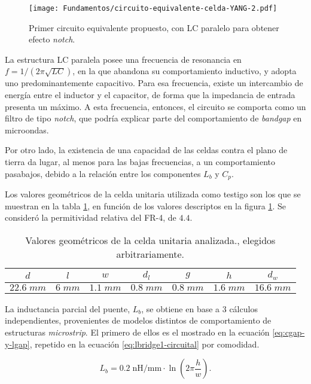 \begin{figure}[h]
	\centering
	\texttt{[image: Fundamentos/circuito-equivalente-celda-YANG-2.pdf]}
	\caption{Primer circuito equivalente propuesto, con LC paralelo para obtener efecto \textit{notch}.}
	\label{fig:primerCircuitoPropuesto}
\end{figure}

La estructura LC paralela posee una frecuencia de resonancia en $f=1/(2 \pi \sqrt{LC})$, en la que abandona su comportamiento inductivo, y adopta uno predominantemente capacitivo. Para esa frecuencia, existe un intercambio de energía entre el inductor y el capacitor, de forma que la impedancia de entrada presenta un máximo. A esta frecuencia, entonces, el circuito se comporta como un filtro de tipo \textit{notch}, que podría explicar parte del comportamiento de \textit{bandgap} en microondas.

Por otro lado, la existencia de una capacidad de las celdas contra el plano de tierra da lugar, al menos para las bajas frecuencias, a un comportamiento pasabajos, debido a la relación entre los componentes $L_b$ y $C_p$.

Los valores geométricos de la celda unitaria utilizada como testigo son los que se muestran en la tabla \ref{table:CeldaUnitariaAnalisisiCircuital}, en función de los valores descriptos en la figura \ref{fig:primerCircuitoPropuesto}. Se consideró la permitividad relativa del FR-4, de $4.4$.

\begin{table}
	\centering
	\begin{tabular}{|c|c|c|c|c|c|c|}
		
		\hline
		$d$ & $l$ & $w$ & $d_l$ & $g$ & $h$ & $d_w$\\ 
		\hline
		$22.6\;mm$ & $6\;mm$ & $1.1\;mm$ & $0.8\;mm$ & $0.8\;mm$ & $1.6\;mm$ & $16.6\;mm$\\ 
		\hline 
	\end{tabular}
	\caption{Valores geométricos de la celda unitaria analizada., elegidos arbitrariamente.}
	\label{table:CeldaUnitariaAnalisisiCircuital}
\end{table}

La inductancia parcial del puente, $L_b$, se obtiene en base a 3 cálculos independientes, provenientes de modelos distintos de comportamiento de estructuras \textit{microstrip}. El primero de ellos es el mostrado en la ecuación \ref{eq:cgap-y-lgap}, repetido en la ecuación \ref{eq:lbridge1-circuital} por comodidad.

\begin{equation}
\label{eq:lbridge1-circuital}
L_{b} = 0.2\; \text{nH/mm} \cdot \ln \left(2\pi \frac{h}{w}\right).
\end{equation}

